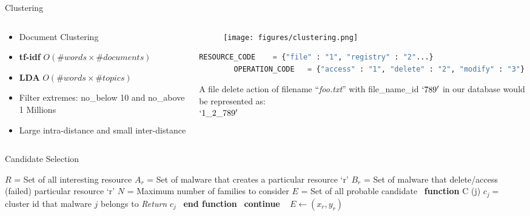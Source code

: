 \documentclass{beamer}
\begin{document}
\begin{frame}[h,fragile]{Clustering}
  \begin{columns}
    \begin{column}{5cm}
      \begin{itemize}
        \item Document Clustering
        \item \textbf{tf-idf} $O(\#words \times \#documents)$
        \item \textbf{LDA} $O(\#words \times \#topics)$
        \item Filter extremes: no\_below 10 and no\_above 1 Millions
        \item Large intra-distance and small inter-distance
      \end{itemize}
    \end{column}
    \begin{column}{5cm}
      \begin{figure}[h]
        \centering
        \texttt{[image: figures/clustering.png]}
      \label{fig:malware_type}
      \end{figure}
      \begin{lstlisting}[numbers=none,basicstyle=\tiny,language=python]
        RESOURCE_CODE    = {"file" : "1", "registry" : "2"...}
        OPERATION_CODE   = {"access" : "1", "delete" : "2", "modify" : "3"}
      \end{lstlisting}
      A file delete action of filename ``\emph{foo.txt}'' with file\_name\_id $`789'$ in our database would be represented as:\\
      $`1\_2\_789'$
    \end{column}
  \end{columns}
\end{frame}
\begin{frame}[plain]{Candidate Selection}
\begin{algorithm}[H]
  \small
  \begin{algorithmic}[1]
    \STATE$R$   = Set of all interesting resource
    \STATE$A_r$ = Set of malware that creates a particular resource `r'
    \STATE$B_r$ = Set of malware that delete/access (failed) particular resource `r'
    \STATE$N$   = Maximum number of families to consider
    \STATE$E$   = Set of all probable candidate
    \STATE\ \textbf{function} C (j)
      \STATE\hspace{\algorithmicindent} $c_j =$ cluster id that malware $j$ belongs to
      \STATE\hspace{\algorithmicindent} \textit{Return} $c_j$
    \STATE\ \textbf{end function}
        \STATE\ \textbf{continue}
      \ENDIF\
          \STATE$E\gets (x_r, y_r)$
        \ENDIF\
      \ENDFOR\
    \ENDFOR\
  \end{algorithmic}
\end{algorithm}
\end{frame}
\end{document}

